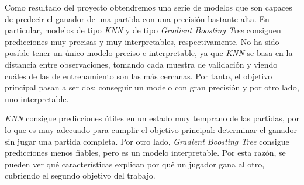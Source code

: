 Como resultado del proyecto obtendremos una serie de modelos que son capaces
de predecir el ganador de una partida con una precisión bastante
alta. En particular, modelos de tipo \emph{KNN} y de tipo
\emph{Gradient Boosting Tree}
consiguen predicciones muy precisas y muy interpretables, respectivamente. No
ha sido posible tener un único modelo preciso e interpretable, ya que \emph{KNN}
se basa en la distancia entre observaciones, tomando cada muestra de validación
y viendo cuáles de las de entrenamiento son las más cercanas.
Por tanto, el objetivo principal pasan a ser dos: conseguir un modelo con gran
precisión y por otro lado, uno interpretable.


\emph{KNN} consigue predicciones útiles en un estado muy temprano
de las partidas, por lo que es muy adecuado para cumplir el objetivo principal:
determinar el ganador sin jugar una partida completa.
Por otro lado, \emph{Gradient Boosting Tree} consigue predicciones menos fiables,
pero es un modelo interpretable. Por esta razón, se pueden ver qué
características explican por qué un jugador gana al otro, cubriendo el
segundo objetivo del trabajo.


